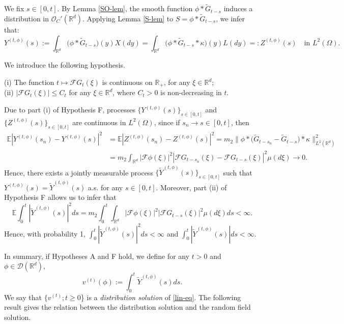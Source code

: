 \documentclass[12pt]{article}
\def\cD{\mathcal{D}}
\def\cF{\mathcal{F}}
\def\cO{\mathcal{O}}
\def\bE{\mathbb{E}}
\def\bR{\mathbb{R}}
\def\k{\kappa}
\begin{document}
We fix $s\in [0,t]$. By Lemma \ref{SO-lem}, the smooth function $\phi* \widetilde{G}_{t-s}$ induces a distribution in $\cO_{C}'(\bR^d)$. 
Applying Lemma \ref{S-lem} to $S=\phi* \widetilde{G}_{t-s}$, we infer that:
\[
Y^{(t,\phi)}(s):=\int_{\bR^d} \big( \phi * \widetilde{G}_{t-s}\big)(y) X(dy)=\int_{\bR^d} \big( \phi * \widetilde{G}_{t-s}* \k \big)(y) L(dy)=: Z^{(t,\phi)}(s) \quad \mbox{in $L^2(\Omega)$}.
\]

We introduce the following hypothesis.

\medskip


 (i) The function $t \mapsto \cF G_t(\xi)$ is continuous on $\bR_{+}$, for any $\xi \in \bR^d$; \\
(ii) $|\cF G_t(\xi)|\leq C_t$ for any $\xi \in \bR^d$, where $C_t>0$ is non-decreasing in $t$.


\medskip

Due to part (i) of Hypothesis F, processes $\{Y^{(t,\phi)}(s)\}_{s \in [0,t]}$ and $\{Z^{(t,\phi)}(s)\}_{s \in [0,t]}$ are continuous in $L^2(\Omega)$, since if $s_n \to s \in [0,t]$, then
\begin{align*}
\bE|Y^{(t,\phi)}(s_n)-Y^{(t,\phi)}(s)|^2&=\bE|Z^{(t,\phi)}(s_n)-Z^{(t,\phi)}(s)|^2=m_2\big \|\phi* \big(\widetilde{G}_{t-s_n}- \widetilde{G}_{t-s}\big)*\k\big\|_{L^2(\bR^d)}^2\\
&=m_2 \int_{\bR^d}|\cF \phi(\xi)|^2 |\cF G_{t-s_n}(\xi)-\cF G_{t-s}(\xi)|^2 \mu(d\xi) \to 0.
\end{align*}
Hence, there exists a jointly measurable process $\{\widetilde{Y}^{(t,\phi)}(s)\}_{s \in [0,t]}$ such that $Y^{(t,\phi)}(s)=\widetilde{Y}^{(t,\phi)}(s)$ a.s. for any $s\in [0,t]$. Moreover, part (ii) of Hypothesis F allows us to infer that
\[
\bE\int_0^t |\widetilde{Y}^{(t,\phi)}(s)|^2 ds=m_2 \int_0^t \int_{\bR^d}|\cF \phi(\xi)|^2 |\cF G_{t-s}(\xi)|^2 \mu(d\xi)ds<\infty.
\]
Hence, with probability 1, $\int_0^t |\widetilde{Y}^{(t,\phi)}(s)|^2 ds<\infty$ and $\int_0^t |\widetilde{Y}^{(t,\phi)}(s)| ds<\infty$. 

In summary, if Hypotheses A and F hold, we define for any $t>0$ and $\phi \in \cD(\bR^d)$,
\begin{equation}
\label{def-vtp}
v^{(t)}(\phi):=\int_0^t \widetilde{Y}^{(t,\phi)}(s)ds.
\end{equation}
We say that  $\{v^{(t)};t\geq 0 $\}  is a {\em distribution solution} of \eqref{lin-eq}.
The following result gives the relation between the distribution solution and the random field solution.
\end{document}

